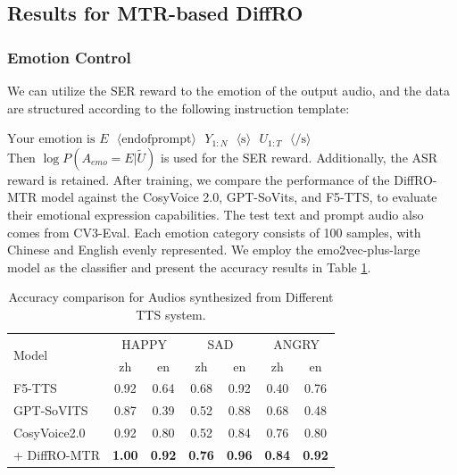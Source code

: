 \documentclass[a4paper]{article}
\begin{document}
\subsection{Results for MTR-based DiffRO}

\subsubsection{Emotion Control}

We can utilize the SER reward to the emotion of the output audio, and the data are structured according to the following instruction template:

    $\text{Your emotion is } E \text{ $\langle$endofprompt$\rangle$ } Y_{1:N} \text{ $\langle$s$\rangle$ }U_{1:T} \text{ $\langle$/s$\rangle$ }$\\
Then $\log P(A_{emo}=E|\tilde{U})$ is used for the SER reward. Additionally, the ASR reward is retained. After training, we compare the performance of the DiffRO-MTR model against the CosyVoice 2.0, GPT-SoVits, and F5-TTS, to evaluate their emotional expression capabilities. The test text and prompt audio also comes from CV3-Eval. Each emotion category consists of 100 samples, with Chinese and English evenly represented. We employ the emo2vec-plus-large model as the classifier and present the accuracy results in Table \ref{tab:ser_result}. 

\begin{table}[!t]
    \centering
    \begin{tabular}{l ccc ccc}
    \hline
        \multirow{2}{*}{Model} & \multicolumn{2}{c}{HAPPY}& \multicolumn{2}{c}{SAD} & \multicolumn{2}{c}{ANGRY}\\
        & zh & en & zh & en & zh & en  \\
    \hline
        F5-TTS\cite{chen-etal-2024-f5tts} &  0.92 & 0.64 & 0.68 &  0.92 & 0.40 & 0.76 \\
        GPT-SoVITS &  0.87 &  0.39 &  0.52 & 0.88 &  0.68 & 0.48 \\
        CosyVoice2.0 &  0.92 &  0.80 &  0.52 & 0.84 & 0.76 & 0.80  \\
         + DiffRO-MTR &  \textbf{1.00} &  \textbf{0.92} &  \textbf{0.76} & \textbf{0.96} & \textbf{0.84} & \textbf{0.92} \\

    \hline
    \end{tabular}
    \caption{Accuracy comparison for Audios synthesized from Different TTS system.}
    \label{tab:ser_result}
\end{table}
\end{document}
